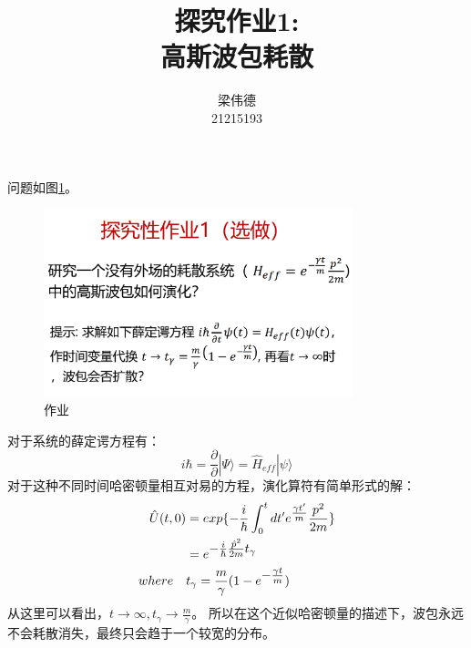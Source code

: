 \documentclass{ctexart}
\author{梁伟德\\ 21215193}
\title{探究作业1:\\\textbf{高斯波包耗散}}
\newcommand{\ket}[1]{|#1\rangle}
\newcommand{\h}[1]{\hat{#1}}
\begin{document}
\maketitle
问题如图\ref{fig:homework}。
\begin{figure}[h]
    \centering
    \caption{作业}\label{fig:homework}
    \includegraphics[width = 0.8\textwidth]{Snipaste_2021-10-15_18-38-55.png}
\end{figure}
\par

对于系统的薛定谔方程有：
\begin{equation}
    i\hbar = \frac{\partial}{\partial} \ket{\Psi} = \hat{H}_{eff} \ket{\psi}
\end{equation}
对于这种不同时间哈密顿量相互对易的方程，演化算符有简单形式的解：
\begin{align}
    \h{U}(t,0) &= exp\{-\frac{i}{\hbar}\int_0^{t} dt' e^{\textstyle \frac{\gamma t'}{m}} \frac{p^2}{2m}\} \notag\\
    &= e^{\textstyle -\frac{i}{\hbar} \frac{\h{p}^2}{2m} t_{\gamma}}  \\
    where \quad & t_{\gamma} = \frac{m}{\gamma}(1-e^{\textstyle -\frac{\gamma t}{m}}) \notag
\end{align}
从这里可以看出，$t \rightarrow \infty, t_{\gamma} \rightarrow \frac{m}{\gamma}$。
所以在这个近似哈密顿量的描述下，波包永远不会耗散消失，最终只会趋于一个较宽的分布。\par
\end{document}

